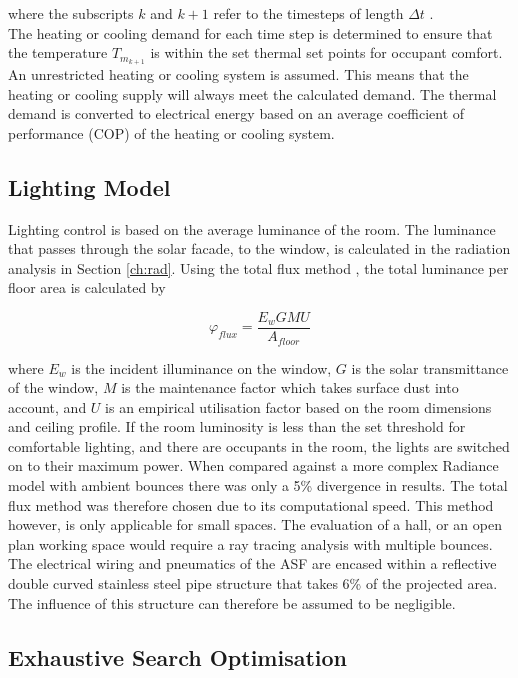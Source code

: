 where the subscripts $k$ and $k+1$ refer to the timesteps of length $\Delta t$ \cite{crank1947practical}.\\

The heating or cooling demand for each time step is determined to ensure that the temperature $T_{m_{k+1}}$ is within the set thermal set points for occupant comfort. An unrestricted heating or cooling system is assumed. This means that the heating or cooling supply will always meet the calculated demand. The thermal demand is converted to electrical energy based on an average coefficient of performance (COP) of the heating or cooling system. 

\subsection{Lighting Model}
Lighting control is based on the average luminance of the room. The luminance that passes through the solar facade, to the window, is calculated in the radiation analysis in Section \ref{ch:rad}. Using the total flux method \cite{szokolay1980handbook}, the total luminance per floor area is calculated by 

\begin{equation} 
\label{eq:lighting}
      \varphi_{flux}={\frac{E_w G M U}{A_{floor}}}
\end{equation}

where $E_w$ is the incident illuminance on the window, $G$ is the solar transmittance of the window, $M$ is the maintenance factor which takes surface dust into account, and $U$ is an empirical utilisation factor based on the room dimensions and ceiling profile. If the room luminosity is less than the set threshold for comfortable lighting, and there are occupants in the room, the lights are switched on to their maximum power. When compared against a more complex Radiance model with ambient bounces there was only a 5\% divergence in results. The total flux method was therefore chosen due to its computational speed. This method however, is only applicable for small spaces. The evaluation of a hall, or an open plan working space would require a ray tracing analysis with multiple bounces. The electrical wiring and pneumatics of the ASF are encased within a reflective double curved stainless steel pipe structure that takes 6\% of the projected area. The influence of this structure can therefore be assumed to be negligible. 

\subsection{Exhaustive Search Optimisation}

